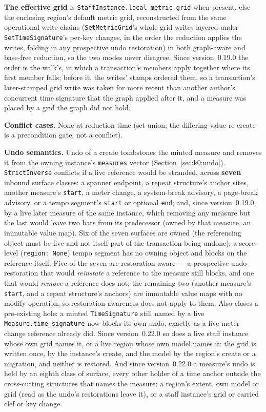 \documentclass[11pt,letterpaper]{report}
\begin{document}
\textbf{The effective grid} is \texttt{StaffInstance.local\_metric\_grid} when
present, else the enclosing region's default metric grid, reconstructed from
the same operational write chains (\texttt{SetMetricGrid}'s whole-grid writes
layered under \texttt{SetTimeSignature}'s per-key changes, in the order the
reduction applies the writes, folding in any prospective undo restoration) in
both graph-aware and base-free reduction, so the two modes never disagree.
Since version~0.19.0 the order is the walk's, in which a transaction's members
apply together where its first member falls; before it, the writes' stamps
ordered them, so a transaction's later-stamped grid write was taken for more
recent than another author's concurrent time signature that the graph applied
after it, and a measure was placed by a grid the graph did not hold.

\textbf{Conflict cases.} None at reduction time (set-union; the differing-value
re-create is a precondition gate, not a conflict).

\textbf{Undo semantics.} Undo of a create tombstones the minted measure and
removes it from the owning instance's \texttt{measures} vector
(Section~\ref{sec:k0:undo}). \texttt{StrictInverse} conflicts if a live
reference would be stranded, across \textbf{seven} inbound surface classes: a
spanner endpoint, a repeat structure's anchor sites, another measure's
\texttt{start}, a meter change, a system-break advisory, a page-break
advisory, or a tempo segment's \texttt{start} or optional \texttt{end}; and,
since version~0.19.0, by a live later measure of the same instance, which
removing any measure but the last would leave two bars from its predecessor
(owned by that measure, an immutable value map). Six of
the seven surfaces are owned (the referencing object must be live and not
itself part of the transaction being undone); a score-level
(\texttt{region: None}) tempo segment has no owning object and blocks on the
reference itself. Five of the seven are restoration-aware --- a prospective
undo restoration that would \emph{reinstate} a reference to the measure still
blocks, and one that would \emph{remove} a reference does not; the remaining
two (another measure's \texttt{start}, and a repeat structure's anchors) are
immutable value maps with no modify operation, so restoration-awareness does
not apply to them. Also closes a pre-existing hole: a minted
\texttt{TimeSignature} still named by a live \texttt{Measure.time\_signature}
now blocks its own undo, exactly as a live meter-change reference already did.
Since version~0.22.0 so does a live staff instance whose own grid names it, or
a live region whose own model names it: the grid is written once, by the
instance's create, and the model by the region's create or a migration, and
neither is restored. And since version~0.22.0 a measure's undo is held by an
eighth class of surface, every other holder of a time anchor outside the
cross-cutting structures that names the measure: a region's extent, own model
or grid (read as the undo's restorations leave it), or a staff instance's
grid or carried clef or key change.
\end{document}
